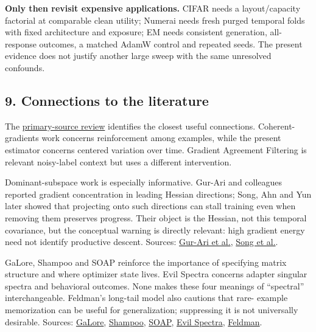 \documentclass[
  british,
  10pt,
  a4paper,
]{article}
\begin{document}
\textbf{Only then revisit expensive
applications\allowbreak{}.\allowbreak{}} CIFAR needs a
layout/\allowbreak{}capacity factorial at comparable clean utility;
Numerai needs fresh purged temporal folds with fixed architecture and
exposure; EM needs consistent generation,\allowbreak{}
all-\allowbreak{}response outcomes, a matched AdamW control and repeated
seeds. The present evidence does not justify another large sweep with
the same unresolved confounds.

\subsection{9. Connections to the
literature}\label{synthesis--connections-to-the-literature}

The \hyperref[primary-literature]{primary-\allowbreak{}source review}
identifies the closest useful connections.\allowbreak{}
Coherent-\allowbreak{}gradients work concerns reinforcement among
examples, while the present estimator concerns centered variation over
time. Gradient Agreement Filtering is relevant noisy-\allowbreak{}label
context but uses a different intervention\allowbreak{}.\allowbreak{}

Dominant-\allowbreak{}subspace work is especially
informative.\allowbreak{} Gur-Ari and colleagues reported gradient
concentration in leading Hessian directions; Song, Ahn and Yun later
showed that projecting onto such directions can stall training even when
removing them preserves progress. Their object is the Hessian, not this
temporal covariance,\allowbreak{} but the conceptual warning is directly
relevant: high gradient energy need not identify productive descent.
Sources: \href{https://arxiv.org/abs/1812.04754}{Gur-Ari et al.},
\href{https://arxiv.org/abs/2405.16002}{Song et al.}.

GaLore, Shampoo and SOAP reinforce the importance of specifying matrix
structure and where optimizer state lives. Evil Spectra concerns adapter
singular spectra and behavioral outcomes. None makes these four meanings
of ``spectral'' interchangea\allowbreak{}ble.\allowbreak{} Feldman's
long-tail model also cautions that rare- example memorization can be
useful for generalization; suppressing it is not universally desirable.
Sources: \href{https://arxiv.org/abs/2403.03507}{GaLore},
\href{https://proceedings.mlr.press/v80/gupta18a.html}{Shampoo},
\href{https://arxiv.org/abs/2409.11321}{SOAP},
\href{https://arxiv.org/abs/2606.31591}{Evil Spectra},
\href{https://arxiv.org/abs/1906.05271}{Feldman}.
\end{document}
